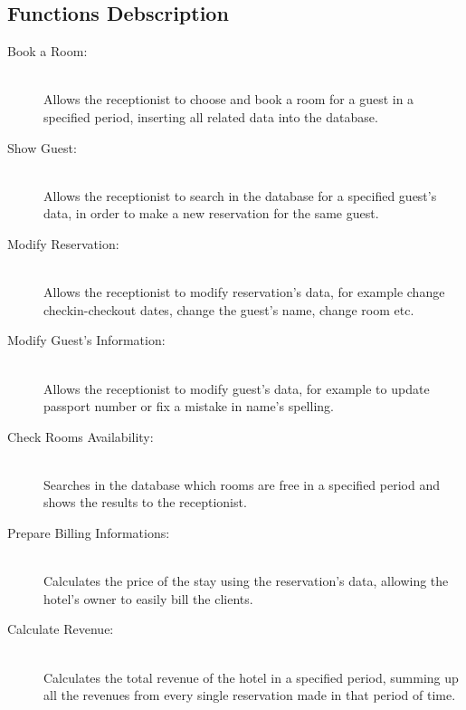 

\subsection{Functions Debscription}

\begin{description}

  \item[Book a Room:] \hfill \\ Allows the receptionist to choose and book a room for a guest in a specified period, inserting all related data into the database.
  
  \item[Show Guest:] \hfill \\ Allows the receptionist to search in the database for a specified guest's data, in order to make a new reservation for the same guest.
    
  \item[Modify Reservation:] \hfill \\ Allows the receptionist to modify reservation's data, for example change checkin-checkout dates, change the guest's name, change room etc.

  \item[Modify Guest's Information:] \hfill \\ Allows the receptionist to modify guest's data, for example to update passport number or fix a mistake in name's spelling.

  \item[Check Rooms Availability:] \hfill \\ Searches in the database which rooms are free in a specified period and shows the results to the receptionist.

  \item[Prepare Billing Informations:] \hfill \\ Calculates the price of the stay using the reservation's data, allowing the hotel's owner to easily bill the clients.

  \item[Calculate Revenue:] \hfill \\ Calculates the total revenue of the hotel in a specified period, summing up all the revenues from every single reservation made in that period of time.

\end{description}




